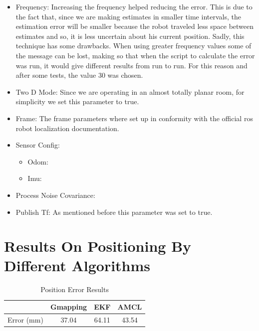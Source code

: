 \begin{itemize}
    \item Frequency: Increasing the frequency helped reducing the error. This is due to the fact that, since we are making estimates in smaller time intervals, the estimation error will be smaller because the robot traveled less space between estimates and so, it is less uncertain about his current position. Sadly, this technique has some drawbacks. When using greater frequency values some of the message can be lost, making so that when the script to calculate the error was run, it would give different results from run to run. For this reason and after some tests, the value 30 was chosen.
    \item Two D Mode: Since we are operating in an almost totally planar room, for simplicity we set this parameter to true.
    \item Frame: The frame parameters where set up in conformity with the official ros robot localization documentation.
    \item Sensor Config: 
        \begin{itemize}
            \item Odom: 
            \item Imu:
        \end{itemize}
    \item Process Noise Covariance:
    \item Publish Tf: As mentioned before this parameter was set to true.
\end{itemize}

\section{Results On Positioning By Different Algorithms} 

\begin{table}[htb]
\centering
\normalsize
{\footnotesize
    \caption{Position Error Results}
    \label{tab:streamingtech}
    \begin{tabular}{ | c | c | c | c |}
    \hline
    & Gmapping & EKF & AMCL\\
    \hline \hline

    Error (mm) & 37.04 & 64.11 & 43.54 \\
    \hline
    
    \end{tabular}
    }
\end{table} 

